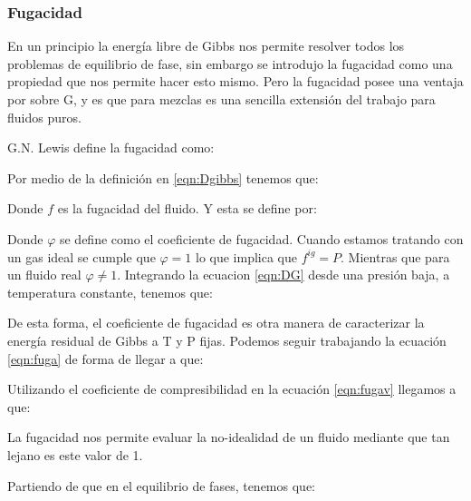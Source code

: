 \subsubsection{Fugacidad}

En un principio la energía libre de Gibbs nos permite resolver todos los problemas de equilibrio de fase, sin embargo se introdujo la fugacidad como una propiedad que nos permite hacer esto mismo. Pero la fugacidad posee una ventaja por sobre G, y es que para mezclas es una sencilla extensión del trabajo para fluidos puros.

G.N. Lewis define la fugacidad como:


Por medio de la definición en \ref{eqn:Dgibbs} tenemos que:


Donde $f$ es la fugacidad del fluido. Y esta se define por:

\insertequation[\label{eqn:defuga}]{f=\varphi P}{}

Donde $\varphi$ se define como el coeficiente de fugacidad. Cuando estamos tratando con un gas ideal se cumple que $\varphi=1$ lo que implica que $f^{ig}=P$. Mientras que para un fluido real $\varphi \neq 1$.
Integrando la ecuacion \ref{eqn:DG} desde una presión baja, a temperatura constante, tenemos que:


De esta forma, el coeficiente de fugacidad es otra manera de caracterizar la energía residual de Gibbs a T y P fijas. 
Podemos seguir trabajando la ecuación \ref{eqn:fuga} de forma de llegar a que:


Utilizando el coeficiente de compresibilidad en la ecuación \ref{eqn:fugav} llegamos a que:


La fugacidad nos permite evaluar la no-idealidad de un fluido mediante que tan lejano es este valor de 1.


Partiendo de que en el equilibrio de fases, tenemos que:

